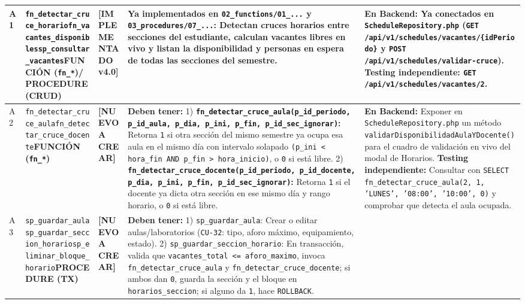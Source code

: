 \documentclass[10pt,a4paper,landscape]{article}
\newcommand{\stListo}{\textbf{\textcolor{teal!80!black}{[IMPLEMENTADO v4.0]}}}
\newcommand{\stNuevo}{\textbf{\textcolor{red!75!black}{[NUEVO A CREAR]}}}
\newcommand{\objProcTx}{\textbf{\textcolor{unjbgNavy}{PROCEDURE (TX)}}}
\newcommand{\objProcCrud}{\textbf{\textcolor{unjbgBlue}{PROCEDURE (CRUD)}}}
\newcommand{\objFunc}{\textbf{\textcolor{teal!80!black}{FUNCIÓN (\texttt{fn\_*})}}}
\begin{document}
\begin{longtable}{|p{0.5cm}|p{3.8cm}|p{2.9cm}|p{8.8cm}|p{9.2cm}|}
A1 & \texttt{fn\_detectar\_cruce\_horario}\newline \texttt{fn\_vacantes\_disponibles}\newline \texttt{sp\_consultar\_vacantes}\newline \objFunc / \objProcCrud & \stListo & 
\textbf{Ya implementados en \texttt{02\_functions/01\_...} y \texttt{03\_procedures/07\_...}:}
Detectan cruces horarios entre secciones del estudiante, calculan vacantes libres en vivo y listan la disponibilidad y personas en espera de todas las secciones del semestre. & 
\textbf{En Backend:} Ya conectados en \texttt{ScheduleRepository.php} (\texttt{GET /api/v1/schedules/vacantes/\{idPeriodo\}} y \texttt{POST /api/v1/schedules/validar-cruce}).\newline
\textbf{Testing independiente:} \texttt{GET /api/v1/schedules/vacantes/2}. \\
\hline
\rowcolor{rowAlt}
A2 & \texttt{fn\_detectar\_cruce\_aula}\newline \texttt{fn\_detectar\_cruce\_docente}\newline \objFunc & \stNuevo & 
\textbf{Deben tener:}
1) \textbf{\texttt{fn\_detectar\_cruce\_aula(p\_id\_periodo, p\_id\_aula, p\_dia, p\_ini, p\_fin, p\_id\_sec\_ignorar)}:} Retorna \texttt{1} si otra sección del mismo semestre ya ocupa esa aula en el mismo día con intervalo solapado \texttt{(p\_ini < hora\_fin AND p\_fin > hora\_inicio)}, o \texttt{0} si está libre.
2) \textbf{\texttt{fn\_detectar\_cruce\_docente(p\_id\_periodo, p\_id\_docente, p\_dia, p\_ini, p\_fin, p\_id\_sec\_ignorar)}:} Retorna \texttt{1} si el docente ya dicta otra sección en ese mismo día y rango horario, o \texttt{0} si está libre. & 
\textbf{En Backend:} Exponer en \texttt{ScheduleRepository.php} un método \texttt{validarDisponibilidadAulaYDocente()} para el cuadro de validación en vivo del modal de Horarios.\newline
\textbf{Testing independiente:} Consultar con \texttt{SELECT fn\_detectar\_cruce\_aula(2, 1, 'LUNES', '08:00', '10:00', 0)} y comprobar que detecta el aula ocupada. \\
\hline
A3 & \texttt{sp\_guardar\_aula}\newline \texttt{sp\_guardar\_seccion\_horario}\newline \texttt{sp\_eliminar\_bloque\_horario}\newline \objProcTx & \stNuevo & 
\textbf{Deben tener:}
1) \texttt{sp\_guardar\_aula}: Crear o editar aulas/laboratorios (\texttt{CU-32}: tipo, aforo máximo, equipamiento, estado).
2) \texttt{sp\_guardar\_seccion\_horario}: En transacción, valida que \texttt{vacantes\_total <= aforo\_maximo}, invoca \texttt{fn\_detectar\_cruce\_aula} y \texttt{fn\_detectar\_cruce\_docente}; si ambos dan \texttt{0}, guarda la sección y el bloque en \texttt{horarios\_seccion}; si alguno da \texttt{1}, hace \texttt{ROLLBACK}.

\end{longtable}
\end{document}
